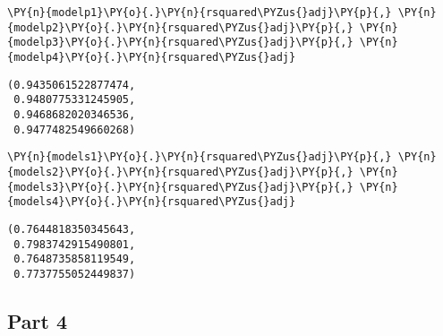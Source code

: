     \begin{tcolorbox}[breakable, size=fbox, boxrule=1pt, pad at break*=1mm,colback=cellbackground, colframe=cellborder]
\begin{Verbatim}[commandchars=\\\{\}]
\PY{n}{modelp1}\PY{o}{.}\PY{n}{rsquared\PYZus{}adj}\PY{p}{,} \PY{n}{modelp2}\PY{o}{.}\PY{n}{rsquared\PYZus{}adj}\PY{p}{,} \PY{n}{modelp3}\PY{o}{.}\PY{n}{rsquared\PYZus{}adj}\PY{p}{,} \PY{n}{modelp4}\PY{o}{.}\PY{n}{rsquared\PYZus{}adj}
\end{Verbatim}
\end{tcolorbox}

            \begin{tcolorbox}[breakable, size=fbox, boxrule=.5pt, pad at break*=1mm, opacityfill=0]
\begin{Verbatim}[commandchars=\\\{\}]
(0.9435061522877474,
 0.9480775331245905,
 0.9468682020346536,
 0.9477482549660268)
\end{Verbatim}
\end{tcolorbox}

    \begin{tcolorbox}[breakable, size=fbox, boxrule=1pt, pad at break*=1mm,colback=cellbackground, colframe=cellborder]
\begin{Verbatim}[commandchars=\\\{\}]
\PY{n}{models1}\PY{o}{.}\PY{n}{rsquared\PYZus{}adj}\PY{p}{,} \PY{n}{models2}\PY{o}{.}\PY{n}{rsquared\PYZus{}adj}\PY{p}{,} \PY{n}{models3}\PY{o}{.}\PY{n}{rsquared\PYZus{}adj}\PY{p}{,} \PY{n}{models4}\PY{o}{.}\PY{n}{rsquared\PYZus{}adj}
\end{Verbatim}
\end{tcolorbox}

            \begin{tcolorbox}[breakable, size=fbox, boxrule=.5pt, pad at break*=1mm, opacityfill=0]
\begin{Verbatim}[commandchars=\\\{\}]
(0.7644818350345643,
 0.7983742915490801,
 0.7648735858119549,
 0.7737755052449837)
\end{Verbatim}
\end{tcolorbox}

    \hypertarget{part-4}{%
\subsection{Part 4}\label{part-4}}

